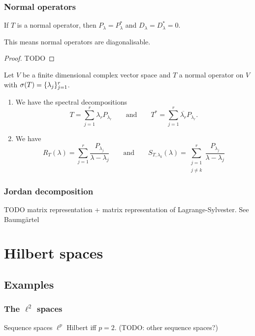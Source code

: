 \subsection{Normal operators}


\begin{proposition}
If $T$ is a normal operator, then $P_\lambda = P^*_\lambda$ and $D_\lambda = D^*_\lambda = 0$.
\end{proposition}
This means normal operators are diagonalisable.
\begin{proof}
TODO
\end{proof}
\begin{corollary}
Let $V$ be a finite dimensional complex vector space and $T$ a normal operator
on $V$ with $\sigma(T) = \{\lambda_j\}_{j=1}^r$.
\begin{enumerate}
\item We have the spectral decompositions
\[ T = \sum_{j=1}^r \lambda_r P_{\lambda_r} \qquad\text{and}\qquad T^* = \sum_{j=1}^r \overline{\lambda_r} P_{\lambda_r}. \]
\item We have
\[ R_T(\lambda) = \sum_{j = 1}^r \frac{P_{\lambda_j}}{\lambda - \lambda_j} \qquad \text{and} \qquad S_{T,\lambda_k}(\lambda) = \sum_{\substack{j = 1 \\ j\neq k}}^r \frac{P_{\lambda_j}}{\lambda - \lambda_j} \]
\end{enumerate}
\end{corollary}

\subsection{Jordan decomposition}
TODO matrix representation + matrix representation of Lagrange-Sylvester. See Baumgärtel







\chapter{Hilbert spaces}

\section{Examples}
\subsection{The $\ell^2$ spaces}
Sequence spaces $\ell^p$ Hilbert iff $p=2$. (TODO: other sequence spaces?)

